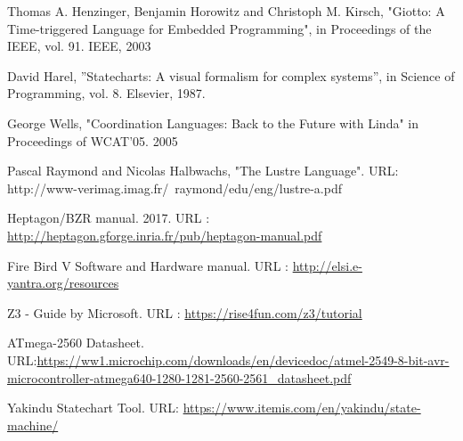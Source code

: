 \documentclass[16pt]{report}
\begin{document}

\renewcommand{\bibname}{References}

\begin{thebibliography}{9}
Thomas A. Henzinger, Benjamin Horowitz and Christoph M. Kirsch,
"Giotto: A Time-triggered Language for Embedded Programming", in Proceedings of the IEEE, vol. 91. IEEE, 2003

 
David Harel, ”Statecharts: A visual formalism for complex systems”, in Science of Programming, vol. 8. Elsevier, 1987.


George Wells, "Coordination Languages: Back to the Future with Linda" in Proceedings of WCAT’05. 2005


Pascal Raymond and Nicolas Halbwachs, "The Lustre Language". URL: http://www-verimag.imag.fr/~raymond/edu/eng/lustre-a.pdf

Heptagon/BZR manual. 2017. URL : \url{http://heptagon.gforge.inria.fr/pub/heptagon-manual.pdf}

Fire Bird V Software and Hardware manual. URL : \url{http://elsi.e-yantra.org/resources}

Z3 - Guide by Microsoft. URL : \url{https://rise4fun.com/z3/tutorial}

ATmega-2560 Datasheet. URL:\url{https://ww1.microchip.com/downloads/en/devicedoc/atmel-2549-8-bit-avr-microcontroller-atmega640-1280-1281-2560-2561\_datasheet.pdf}

Yakindu Statechart Tool. URL: \url{https://www.itemis.com/en/yakindu/state-machine/}


\end{thebibliography}
\end{document}

